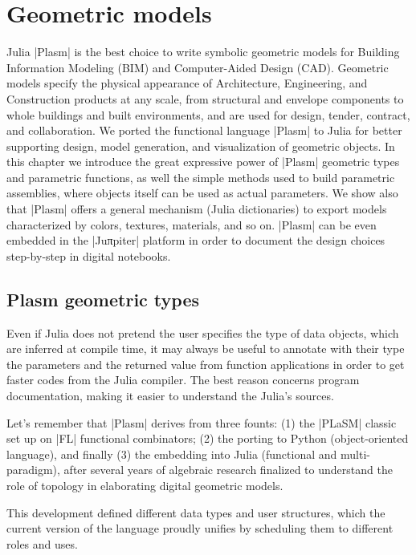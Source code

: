 
\chapter{Geometric models}
\label{chapt:4}

Julia |Plasm| is the best choice to write symbolic geometric models for Building Information Modeling (BIM) and Computer-Aided Design (CAD).  Geometric models specify the physical appearance of Architecture, Engineering, and Construction products at any scale, from structural and envelope components to whole buildings and built environments, and are used for design, tender, contract, and collaboration. We ported the  functional language |Plasm| to Julia for better supporting design, model generation, and visualization of geometric objects.
In this chapter we introduce the great expressive power of |Plasm| geometric types and parametric functions, as well the simple methods used to build parametric assemblies, where objects itself can be used as actual parameters. We show also that |Plasm| offers a  general mechanism (Julia dictionaries) to export models characterized by colors, textures, materials, and so on. |Plasm| can be even embedded in the |Juπpiter| platform in order to document the design choices step-by-step in digital notebooks.

\section{Plasm geometric types}\label{sect:4-1}

Even if Julia does not pretend the user specifies the type of data objects, which are inferred at compile time, it may always be useful to annotate with their type the parameters and the returned value from function applications in order to get faster codes from the Julia compiler. The best reason concerns program documentation, making it easier to understand the Julia's sources.

Let's remember that |Plasm| derives from three founts: (1) the |PLaSM| classic set up on |FL| functional combinators; (2) the porting to Python (object-oriented language), and finally (3) the embedding into Julia (functional and multi-paradigm), after several years of algebraic research finalized to understand the role of topology in elaborating digital  geometric models. 

This development defined different data types and user structures, which the current version of the language proudly unifies by scheduling them to different roles and uses.
 


